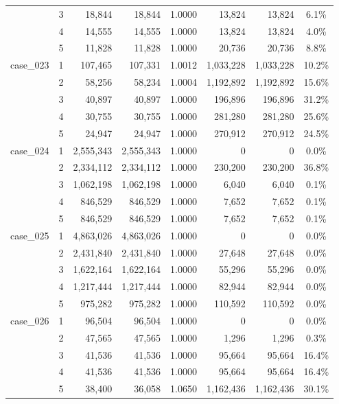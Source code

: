 \begin{footnotesize}
\begin{longtable}{l c rr c rr c}
 & 3 & 18{,}844 & 18{,}844 & 1.0000 & 13{,}824 & 13{,}824 & 6.1\% \\
 & 4 & 14{,}555 & 14{,}555 & 1.0000 & 13{,}824 & 13{,}824 & 4.0\% \\
 & 5 & 11{,}828 & 11{,}828 & 1.0000 & 20{,}736 & 20{,}736 & 8.8\% \\
\addlinespace[2pt]
case\_023 & 1 & 107{,}465 & 107{,}331 & 1.0012 & 1{,}033{,}228 & 1{,}033{,}228 & 10.2\% \\
 & 2 & 58{,}256 & 58{,}234 & 1.0004 & 1{,}192{,}892 & 1{,}192{,}892 & 15.6\% \\
 & 3 & 40{,}897 & 40{,}897 & 1.0000 & 196{,}896 & 196{,}896 & 31.2\% \\
 & 4 & 30{,}755 & 30{,}755 & 1.0000 & 281{,}280 & 281{,}280 & 25.6\% \\
 & 5 & 24{,}947 & 24{,}947 & 1.0000 & 270{,}912 & 270{,}912 & 24.5\% \\
\addlinespace[2pt]
case\_024 & 1 & 2{,}555{,}343 & 2{,}555{,}343 & 1.0000 & 0 & 0 & 0.0\% \\
 & 2 & 2{,}334{,}112 & 2{,}334{,}112 & 1.0000 & 230{,}200 & 230{,}200 & 36.8\% \\
 & 3 & 1{,}062{,}198 & 1{,}062{,}198 & 1.0000 & 6{,}040 & 6{,}040 & 0.1\% \\
 & 4 & 846{,}529 & 846{,}529 & 1.0000 & 7{,}652 & 7{,}652 & 0.1\% \\
 & 5 & 846{,}529 & 846{,}529 & 1.0000 & 7{,}652 & 7{,}652 & 0.1\% \\
\addlinespace[2pt]
case\_025 & 1 & 4{,}863{,}026 & 4{,}863{,}026 & 1.0000 & 0 & 0 & 0.0\% \\
 & 2 & 2{,}431{,}840 & 2{,}431{,}840 & 1.0000 & 27{,}648 & 27{,}648 & 0.0\% \\
 & 3 & 1{,}622{,}164 & 1{,}622{,}164 & 1.0000 & 55{,}296 & 55{,}296 & 0.0\% \\
 & 4 & 1{,}217{,}444 & 1{,}217{,}444 & 1.0000 & 82{,}944 & 82{,}944 & 0.0\% \\
 & 5 & 975{,}282 & 975{,}282 & 1.0000 & 110{,}592 & 110{,}592 & 0.0\% \\
\addlinespace[2pt]
case\_026 & 1 & 96{,}504 & 96{,}504 & 1.0000 & 0 & 0 & 0.0\% \\
 & 2 & 47{,}565 & 47{,}565 & 1.0000 & 1{,}296 & 1{,}296 & 0.3\% \\
 & 3 & 41{,}536 & 41{,}536 & 1.0000 & 95{,}664 & 95{,}664 & 16.4\% \\
 & 4 & 41{,}536 & 41{,}536 & 1.0000 & 95{,}664 & 95{,}664 & 16.4\% \\
 & 5 & 38{,}400 & 36{,}058 & 1.0650 & 1{,}162{,}436 & 1{,}162{,}436 & 30.1\% \\

\end{longtable}
\end{footnotesize}
